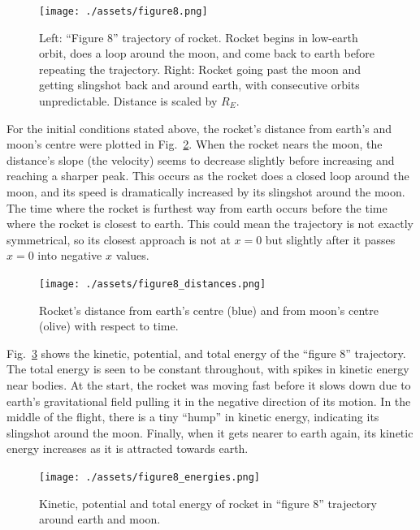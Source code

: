 \documentclass[hyphens,twocolumn,nobalancelastpage,aps,10pt,citeautoscript,longbibliography]{revtex4-2}
\begin{document}
\begin{figure}[htpb]
	\centering
	\texttt{[image: ./assets/figure8.png]}
	\caption{Left: ``Figure 8'' trajectory of rocket. Rocket begins in
	low-earth orbit, does a loop around the moon, and come back to earth before
	repeating the trajectory. Right: Rocket going past the moon and getting
	slingshot back and around earth, with consecutive orbits unpredictable.
	Distance is scaled by $R_E$.}%
	\label{fig:./assets/figure8}
\end{figure}

For the initial conditions stated above, the rocket's distance from earth's and
moon's centre were plotted in Fig.~\ref{fig:./assets/figure8_distances}. When
the rocket nears the moon, the distance's slope (the velocity) seems to
decrease slightly before increasing and reaching a sharper peak. This occurs as
the rocket does a closed loop around the moon, and its speed is dramatically
increased by its slingshot around the moon. The time where the rocket is
furthest way from earth occurs before the time where the rocket is closest to
earth. This could mean the trajectory is not exactly symmetrical, so its
closest approach is not at $x=0$ but slightly after it passes $x=0$ into
negative $x$ values.

\begin{figure}[htpb]
	\centering
	\texttt{[image: ./assets/figure8\_distances.png]}
	\caption{Rocket's distance from earth's centre (blue) and from moon's centre (olive) with respect to time.}%
	\label{fig:./assets/figure8_distances}
\end{figure}

Fig.~\ref{fig:./assets/figure8_energies} shows the kinetic, potential, and
total energy of the ``figure 8'' trajectory. The total energy is seen to be
constant throughout, with spikes in kinetic energy near bodies. At the start,
the rocket was moving fast before it slows down due to earth's gravitational
field pulling it in the negative direction of its motion. In the middle of the
flight, there is a tiny ``hump'' in kinetic energy, indicating its slingshot
around the moon. Finally, when it gets nearer to earth again, its kinetic
energy increases as it is attracted towards earth.

\begin{figure}[htpb]
	\centering
	\texttt{[image: ./assets/figure8\_energies.png]}
	\caption{Kinetic, potential and total energy of rocket in ``figure 8''
	trajectory around earth and moon.}
	\label{fig:./assets/figure8_energies}
\end{figure}
\end{document}
